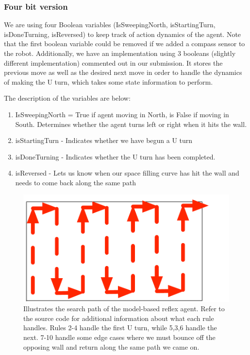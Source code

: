 \documentclass{article}
\begin{document}
\subsubsection{Four bit version}

We are using  four Boolean variables (IsSweepingNorth, isStartingTurn, isDoneTurning, isReversed) to keep track of action dynamics of the agent. Note that the first boolean variable could be removed if we added a compass sensor to the robot.  Additionally, we have an implementation using 3 booleans (slightly different implementation) commented out in our submission.  It stores the previous move as well as the desired next move in order to handle the dynamics of making the U turn, which takes some state information to perform.

The description of the variables are below: 
\begin{enumerate}
\item IsSweepingNorth = True if agent moving in North, is False if moving in South. Determines whether the agent turns left or right when it hits the wall.
\item isStartingTurn - Indicates whether we have begun a U turn
\item isDoneTurning - Indicates whether the U turn has been completed.
\item isReversed - Lets us know when our space filling curve has hit the wall and needs to come back along the same path 
\end{enumerate}

\begin{figure}[h!]
\centering
\includegraphics[width=.6\linewidth]{snaking}
\caption{Illustrates the search path of the model-based reflex agent.  Refer to the source code for additional information about what each rule handles.  Rules 2-4 handle the first U turn, while 5,3,6 handle the next.  7-10 handle some edge cases where we must bounce off the opposing wall and return along the same path we came on.}
\label{fig:reflex}
\end{figure}
\clearpage
\end{document}
